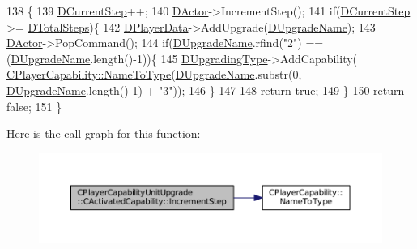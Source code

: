 \begin{DoxyCode}
138                                                                     \{
139     \hyperlink{classCPlayerCapabilityUnitUpgrade_1_1CActivatedCapability_a3ffaf9372ee622c3ef439396dfd00db6}{DCurrentStep}++;
140     \hyperlink{classCActivatedPlayerCapability_a54ca944b47bff2718330639941d402b0}{DActor}->IncrementStep();
141     \textcolor{keywordflow}{if}(\hyperlink{classCPlayerCapabilityUnitUpgrade_1_1CActivatedCapability_a3ffaf9372ee622c3ef439396dfd00db6}{DCurrentStep} >= \hyperlink{classCPlayerCapabilityUnitUpgrade_1_1CActivatedCapability_a56d9f9fd76c8757955e84ae8f56d5337}{DTotalSteps})\{
142         \hyperlink{classCActivatedPlayerCapability_a9bf27c322a73f4b11c8183cc1973c3d8}{DPlayerData}->AddUpgrade(\hyperlink{classCPlayerCapabilityUnitUpgrade_1_1CActivatedCapability_acb0261591d692393b3c864d75edc799f}{DUpgradeName});
143         \hyperlink{classCActivatedPlayerCapability_a54ca944b47bff2718330639941d402b0}{DActor}->PopCommand();
144         \textcolor{keywordflow}{if}(\hyperlink{classCPlayerCapabilityUnitUpgrade_1_1CActivatedCapability_acb0261591d692393b3c864d75edc799f}{DUpgradeName}.rfind(\textcolor{stringliteral}{"2"}) == (\hyperlink{classCPlayerCapabilityUnitUpgrade_1_1CActivatedCapability_acb0261591d692393b3c864d75edc799f}{DUpgradeName}.length()-1))\{
145             \hyperlink{classCPlayerCapabilityUnitUpgrade_1_1CActivatedCapability_a028e222f2adc8a1035090487c93b358b}{DUpgradingType}->AddCapability(
      \hyperlink{classCPlayerCapability_a920a696526e8a839f728192aea0ba1c5}{CPlayerCapability::NameToType}(\hyperlink{classCPlayerCapabilityUnitUpgrade_1_1CActivatedCapability_acb0261591d692393b3c864d75edc799f}{DUpgradeName}.substr(0, 
      \hyperlink{classCPlayerCapabilityUnitUpgrade_1_1CActivatedCapability_acb0261591d692393b3c864d75edc799f}{DUpgradeName}.length()-1) + \textcolor{stringliteral}{"3"}));
146         \}
147         
148         \textcolor{keywordflow}{return} \textcolor{keyword}{true};    
149     \}
150     \textcolor{keywordflow}{return} \textcolor{keyword}{false};
151 \}
\end{DoxyCode}
Here is the call graph for this function\+:
\nopagebreak
\begin{figure}[H]
\begin{center}
\leavevmode
\includegraphics[width=350pt]{classCPlayerCapabilityUnitUpgrade_1_1CActivatedCapability_a86833312cb2f2460e923808fe0e19223_cgraph}
\end{center}
\end{figure}
